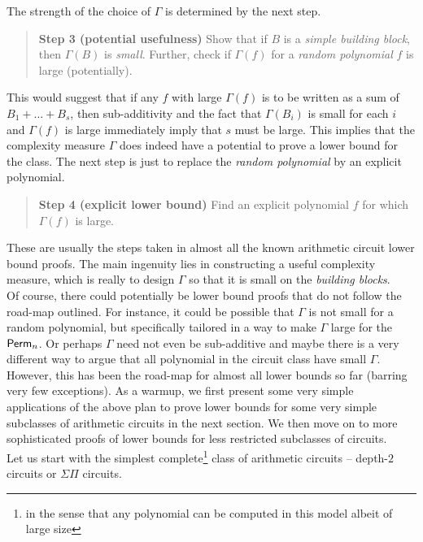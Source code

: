 The strength of the choice of $\Gamma$ is determined by the next step. 

\begin{quote}
{\bf Step 3 (potential usefulness)} Show that if $B$ is a \emph{simple building block}, then $\Gamma(B)$ is \emph{small}.
Further, check if $\Gamma(f)$ for a \emph{random polynomial} $f$ is large (potentially). 
\end{quote}

This would suggest that if any $f$ with large $\Gamma(f)$ is to be written as a sum of $B_1 + \dots + B_s$, then sub-additivity and the fact that $\Gamma(B_i)$ is small for each $i$ and $\Gamma(f)$ is large immediately imply that $s$ must be large. 
This implies that the complexity measure $\Gamma$ does indeed have a potential to prove a lower bound for the class. 
The next step is just to replace the \emph{random polynomial} by an explicit polynomial. 

\begin{quote}
{\bf Step 4 (explicit lower bound)} Find an explicit polynomial $f$ for which $\Gamma(f)$ is large. 
\end{quote} 



These are usually the steps taken in almost all the known arithmetic circuit lower bound proofs. 
The main ingenuity lies in constructing a useful complexity measure, which is really to design $\Gamma$ so that it is small on the \emph{building blocks}. \\

Of course, there could potentially be lower bound proofs that do not follow the road-map outlined. 
For instance, it could be possible that $\Gamma$ is not small for a random polynomial, but specifically tailored in a way to make $\Gamma$ large for the $\operatorname{\mathsf{Perm}}_n$. 
Or perhaps $\Gamma$ need not even be sub-additive and maybe there is a very different way to argue that all polynomial in the circuit class have small $\Gamma$. 
However, this has been the road-map for almost all lower bounds so far (barring very few exceptions). 
As a warmup, we first present some very simple applications of the above plan to prove lower bounds for some very simple subclasses of arithmetic circuits in the next section. 
We then move on to more sophisticated proofs of lower bounds for less restricted subclasses of circuits. \\


Let us start with the simplest complete\footnote{in the sense that any polynomial can be computed in this model albeit of large size}  class of arithmetic circuits -- depth-$2$ circuits or $\Sigma\Pi$ circuits. 

